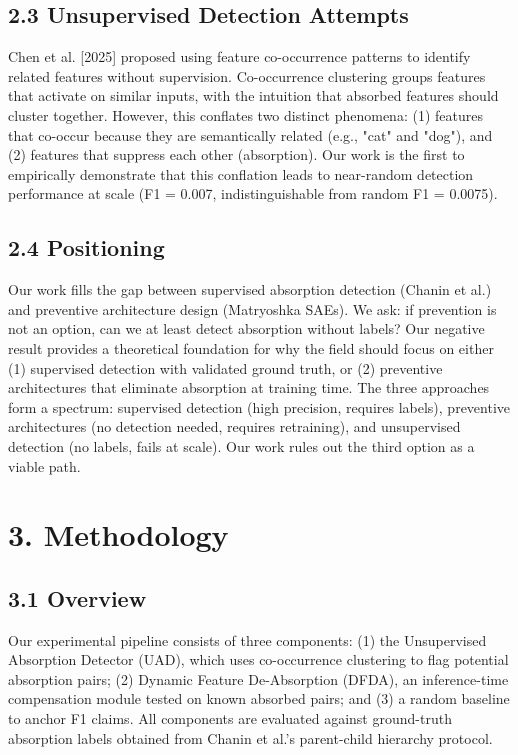 \documentclass{article}
\begin{document}
\subsection{2.3 Unsupervised Detection Attempts}

Chen et al. [2025] proposed using feature co-occurrence patterns to identify related features without supervision. Co-occurrence clustering groups features that activate on similar inputs, with the intuition that absorbed features should cluster together. However, this conflates two distinct phenomena: (1) features that co-occur because they are semantically related (e.g., "cat" and "dog"), and (2) features that suppress each other (absorption). Our work is the first to empirically demonstrate that this conflation leads to near-random detection performance at scale (F1 = 0.007, indistinguishable from random F1 = 0.0075).

\subsection{2.4 Positioning}

Our work fills the gap between supervised absorption detection (Chanin et al.) and preventive architecture design (Matryoshka SAEs). We ask: if prevention is not an option, can we at least detect absorption without labels? Our negative result provides a theoretical foundation for why the field should focus on either (1) supervised detection with validated ground truth, or (2) preventive architectures that eliminate absorption at training time. The three approaches form a spectrum: supervised detection (high precision, requires labels), preventive architectures (no detection needed, requires retraining), and unsupervised detection (no labels, fails at scale). Our work rules out the third option as a viable path.


\section{3. Methodology}

\subsection{3.1 Overview}

Our experimental pipeline consists of three components: (1) the Unsupervised Absorption Detector (UAD), which uses co-occurrence clustering to flag potential absorption pairs; (2) Dynamic Feature De-Absorption (DFDA), an inference-time compensation module tested on known absorbed pairs; and (3) a random baseline to anchor F1 claims. All components are evaluated against ground-truth absorption labels obtained from Chanin et al.'s parent-child hierarchy protocol.
\end{document}

